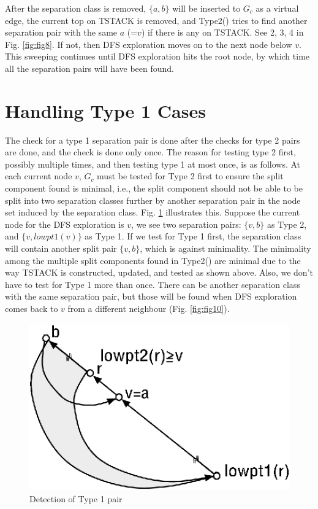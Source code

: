 \documentclass[twoside,twocolumn]{article}
\begin{document}
After the separation class is removed, $\{a,b\}$ will be inserted to $G_c$ as a
virtual edge, the current top on {\ttfamily TSTACK} is removed, and
{\ttfamily Type2()} tries to find another separation pair with the same $a$
(=$v$) if there is any on {\ttfamily TSTACK}. See 2, 3, 4 in Fig. \ref{fig:fig8}.
If not, then DFS exploration moves on to the next node below $v$.
This sweeping continues until DFS exploration hits the root node,
by which time all the separation pairs will have been found.


\section{Handling Type 1 Cases}
The check for a type 1 separation pair is done after the checks for type 2
 pairs are done, and the check is done only once.
The reason for testing type 2 first, possibly multiple times, and then testing
 type 1 at most once, is as follows.
At each current node $v$, $G_c$ must be tested for Type 2 first to ensure
the split component found is minimal, i.e., the split component should not
 be able to be split into two separation classes further by another separation pair
 in the node set induced by the separation class.
Fig. \ref{fig:fig9} illustrates this. Suppose the current node for the DFS exploration is $v$,
 we see two separation pairs: $\{v, b\}$ as Type 2, and $\{v, lowpt1(v)\}$ as Type 1.
If we test for Type 1 first, the separation class will contain another split
pair $\{v,b\}$, which is against minimality.
The minimality among the multiple split components found in {\ttfamily Type2()}
are minimal due to the way {\ttfamily TSTACK} is constructed, updated, and tested as
shown above.
Also, we don't have to test for Type 1 more than once.
There can be another separation class with the same separation pair, but those will be found when DFS exploration comes 
back to $v$ from a different neighbour (Fig. \ref{fig:fig10}).

\begin{figure}[!htb]
\centering
\includegraphics[scale=1.0]{spqr_fig9.eps}
\caption{Detection of Type 1 pair}
\label{fig:fig9}
\end{figure}
\end{document}
